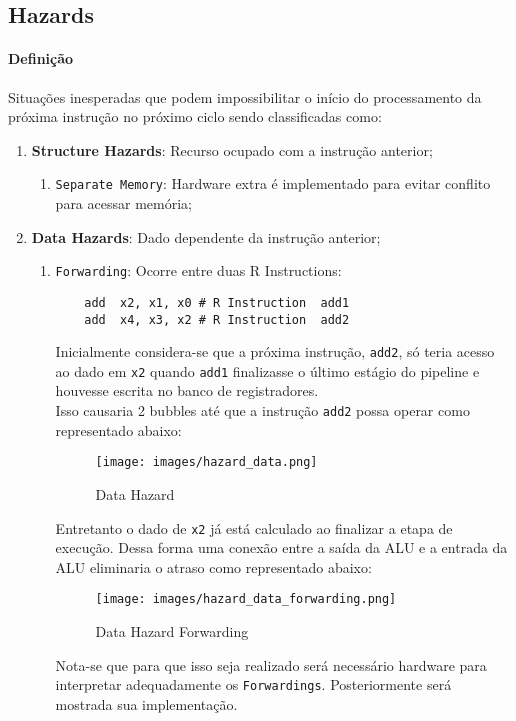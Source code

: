 \documentclass{article}
\begin{document}
\subsection{Hazards}
\paragraph{Definição}Situações inesperadas que podem impossibilitar o início do processamento da próxima instrução no próximo ciclo sendo classificadas como:
\begin{enumerate}[rightmargin = \leftmargin]
    \item \textbf{Structure Hazards}: Recurso ocupado com a instrução anterior;
    \begin{enumerate}[rightmargin = \leftmargin]
        \item \texttt{Separate Memory}: Hardware extra é implementado para evitar conflito para acessar memória;
    \end{enumerate}

    \item \textbf{Data Hazards}: Dado dependente da instrução anterior;
    \begin{enumerate}[rightmargin = \leftmargin]
        \item \texttt{Forwarding}: Ocorre entre duas R Instructions:
        \begin{scriptsize}
            \myStyleRISCV
            \begin{lstlisting}
    add  x2, x1, x0 # R Instruction  add1
    add  x4, x3, x2 # R Instruction  add2
            \end{lstlisting}
        \end{scriptsize}
        Inicialmente considera-se que a próxima instrução, \texttt{add2}, só teria acesso ao dado em \texttt{x2} quando \texttt{add1} finalizasse o último estágio do pipeline e houvesse escrita no banco de registradores.\\

        \noindent Isso causaria 2 bubbles até que a instrução \texttt{add2} possa operar como representado abaixo:
        \begin{figure}[H]
            \centering
            \texttt{[image: images/hazard\_data.png]}
            \caption{Data Hazard}
            \label{hazardData}
        \end{figure}
        
        Entretanto o dado de \texttt{x2} já está calculado ao finalizar a etapa de execução. Dessa forma uma conexão entre a saída da ALU e a entrada da ALU eliminaria o atraso como representado abaixo:
        \begin{figure}[H]
            \centering
            \texttt{[image: images/hazard\_data\_forwarding.png]}
            \caption{Data Hazard Forwarding}
            \label{hazardDataForwarding}
        \end{figure}
        Nota-se que para que isso seja realizado será necessário hardware para interpretar adequadamente os \texttt{Forwardings}. Posteriormente será mostrada sua implementação.


\end{enumerate}
\end{enumerate}
\end{document}
